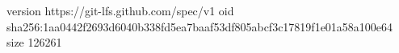 version https://git-lfs.github.com/spec/v1
oid sha256:1aa0442f2693d6040b338fd5ea7baaf53df805abcf3c17819f1e01a58a100e64
size 126261
